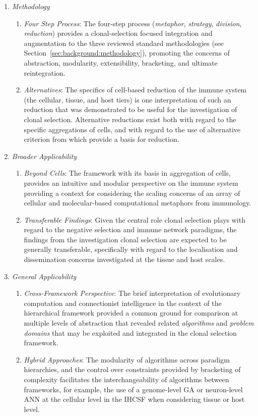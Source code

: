 \begin{enumerate}	
	
	\item \emph{Methodology}
		\begin{enumerate}
			\item \emph{Four Step Process}: The four-step process (\emph{metaphor}, \emph{strategy}, \emph{division}, \emph{reduction}) provides a clonal-selection focused integration and augmentation to the three reviewed standard methodologies (see Section~\ref{sec:background:methodology}), promoting the concerns of abstraction, modularity, extensibility, bracketing, and ultimate reintegration.
			\item \emph{Alternatives}: The specifics of cell-based reduction of the immune system (the cellular, tissue, and host tiers) is one interpretation of such an reduction that was demonstrated to be useful for the investigation of clonal selection. Alternative reductions exist both with regard to the specific aggregations of cells, and with regard to the use of alternative criterion from which provide a basis for reduction.
		\end{enumerate}
	
	\item \emph{Broader Applicability}
		\begin{enumerate}
			\item \emph{Beyond Cells}: The framework with its basis in aggregation of cells, provides an intuitive and modular perspective on the immune system providing a context for considering the scaling concerns of an array of cellular and molecular-based computational metaphors from immunology.
			\item \emph{Transferable Findings}: Given the central role clonal selection plays with regard to the negative selection and immune network paradigms, the findings from the investigation clonal selection are expected to be generally transferable, specifically with regard to the localisation and dissemination concerns investigated at the tissue and host scales.
		\end{enumerate}	
	
	\item \emph{General Applicability}
		\begin{enumerate}	
			\item \emph{Cross-Framework Perspective}: The brief interpretation of evolutionary computation and connectionist intelligence in the context of the hierarchical framework provided a common ground for comparison at multiple levels of abstraction that revealed related \emph{algorithms} and \emph{problem domains} that may be exploited and integrated in the clonal selection framework.
			\item \emph{Hybrid Approaches}: The modularity of algorithms across paradigm hierarchies, and the control over constraints provided by bracketing of complexity facilitates the interchangeability of algorithms between frameworks, for example, the use of a genome-level GA or neuron-level ANN at the cellular level in the IHCSF when considering tissue or host level. 		
		\end{enumerate}		
\end{enumerate}


